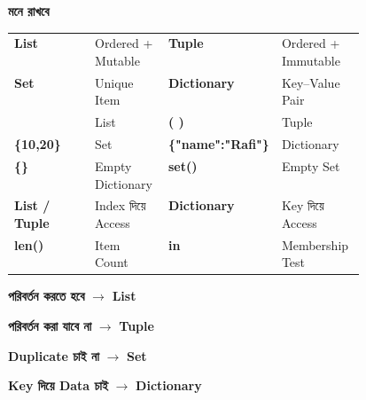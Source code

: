\begin{rememberbox}

\textbf{\color{deepOrange}মনে রাখবে}

\begin{tabularx}
{\linewidth}
{
>{\bfseries\RaggedRight\arraybackslash}p{0.23\linewidth}
Y
>{\bfseries\RaggedRight\arraybackslash}p{0.23\linewidth}
Y
}

List
&
Ordered + Mutable
&
Tuple
&
Ordered + Immutable
\\[0.5mm]

Set
&
Unique Item
&
Dictionary
&
Key--Value Pair
\\[0.5mm]

\textenglish{\ttfamily [ ]}
&
List
&
\textenglish{\ttfamily ( )}
&
Tuple
\\[0.5mm]

\textenglish{\ttfamily \{10,20\}}
&
Set
&
\textenglish{\ttfamily \{"name":"Rafi"\}}
&
Dictionary
\\[0.5mm]

\textenglish{\ttfamily \{\}}
&
Empty Dictionary
&
\textenglish{\ttfamily set()}
&
Empty Set
\\[0.5mm]

List / Tuple
&
Index দিয়ে Access
&
Dictionary
&
Key দিয়ে Access
\\[0.5mm]

\textenglish{\ttfamily len()}
&
Item Count
&
\textenglish{\ttfamily in}
&
Membership Test
\\

\end{tabularx}

\medskip

\begin{center}

\textbf{পরিবর্তন করতে হবে}
\(\longrightarrow\)
\textbf{List}

\qquad

\textbf{পরিবর্তন করা যাবে না}
\(\longrightarrow\)
\textbf{Tuple}

\medskip

\textbf{Duplicate চাই না}
\(\longrightarrow\)
\textbf{Set}

\qquad

\textbf{Key দিয়ে Data চাই}
\(\longrightarrow\)
\textbf{Dictionary}

\end{center}

\end{rememberbox}

\small


